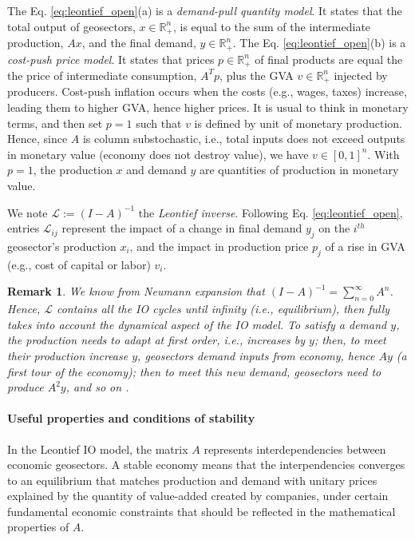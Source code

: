 \documentclass{article}
\newtheorem{remark}{Remark}
\begin{document}
\noindent The Eq. \eqref{eq:leontief_open}(a) is a \textit{demand-pull quantity model}. It states that the total output of geosectors, $x \in \mathbb{R}_+^{n}$, is equal to the sum of the intermediate production, $Ax$, and the final demand, $y \in \mathbb{R}_+^{n}$. The Eq. \eqref{eq:leontief_open}(b) is a \textit{cost-push price model}. It states that prices $p \in \mathbb{R}_+^{n}$ of final products are equal the the price of intermediate consumption, $A^T p$, plus the GVA $v \in \mathbb{R}_+^{n}$ injected by producers. Cost-push inflation occurs when the costs (e.g., wages, taxes) increase, leading them to higher GVA, hence higher prices. It is usual to think in monetary terms, and then set $p=1$ such that $v$ is defined by unit of monetary production. Hence, since $A$ is column substochastic, i.e., total inputs does not exceed outputs in monetary value (economy does not destroy value), we have $v \in [0,1]^n$. With $p=1$, the production $x$ and demand $y$ are quantities of production in monetary value. 

\vspace{0.1cm}

We note $\mathcal{L}:=(I-A)^{-1}$ the \textit{Leontief inverse}. 
Following Eq. \eqref{eq:leontief_open}, entries $\mathcal{L}_{ij}$ represent the impact of a change in final demand $y_j$ on the $i^{th}$ geosector's production $x_i$, and the impact in production price $p_j$ of a rise in GVA (e.g., cost of capital or labor) $v_i$. 

\begin{remark}
\label{remark:leontief_inverse}
We know from Neumann expansion that $(I-A)^{-1}=\sum_{n=0}^\infty A^n$. Hence, $\mathcal{L}$ contains all the IO cycles until infinity (i.e., equilibrium), then fully takes into account the dynamical aspect of the IO model. To satisfy a demand $y$, the production needs to adapt at first order, i.e., increases by $y$; then, to meet their production increase $y$, geosectors demand inputs from economy, hence $A y$ (a first tour of the economy); then to meet this new demand, geosectors need to produce $A^2y$, and so on \cite{bartolucci2020inversion}. 
\end{remark}

\paragraph{Useful properties and conditions of stability}
In the Leontief IO model, the matrix $A$ represents interdependencies between economic geosectors. A stable economy means that the interpendencies converges to an equilibrium that matches production and demand with unitary prices explained by the quantity of value-added created by companies, under certain fundamental economic constraints that should be reflected in the mathematical properties of $A$. 
\end{document}
